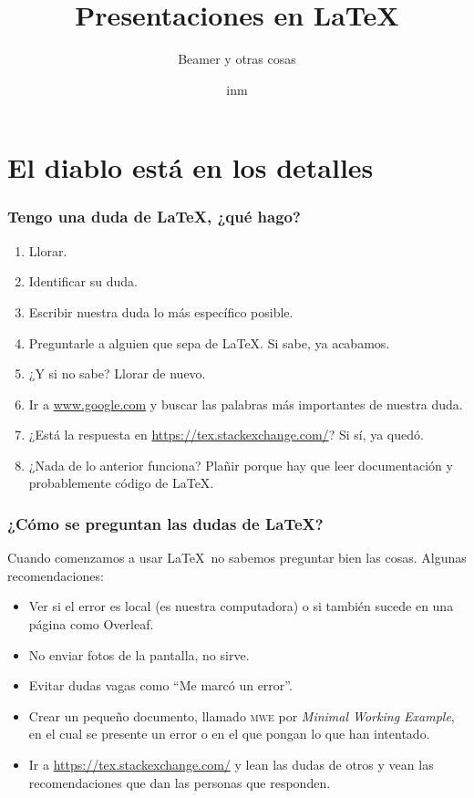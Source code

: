 \documentclass{beamer}
\title{Presentaciones en \LaTeX}
\subtitle{Beamer y otras cosas}
\author{inm}
\institute{Taller de \LaTeX}
\begin{document}
\begin{frame}
    \maketitle
\end{frame}

\section{El diablo está en los detalles}

\begin{frame}
    \frametitle{Tengo una duda de \LaTeX, ¿qué hago?}

    \begin{enumerate}[<+->]
        \item Llorar.
        \item Identificar su duda.
        \item Escribir nuestra duda lo más específico posible.
        \item Preguntarle a alguien que sepa de \LaTeX. Si sabe, ya acabamos.
        \item ¿Y si no sabe? Llorar de nuevo.
        \item Ir a \url{www.google.com} y buscar las palabras más importantes de nuestra duda.
        \item ¿Está la respuesta en \url{https://tex.stackexchange.com/}? Si sí, ya quedó.
        \item ¿Nada de lo anterior funciona? Plañir porque hay que leer documentación y probablemente código de \LaTeX.
    \end{enumerate}

\end{frame}

\begin{frame}
    \frametitle{¿Cómo se preguntan las dudas de \LaTeX?}

    Cuando comenzamos a usar \LaTeX\ no sabemos preguntar bien las cosas. Algunas recomendaciones:
    \begin{itemize}
        \item Ver si el error es local (es nuestra computadora) o si también sucede en una página como Overleaf.
        \item No enviar fotos de la pantalla, no sirve.
        \item Evitar dudas vagas como ``Me marcó un error''.
        \item Crear un pequeño documento, llamado \textsc{mwe} por \emph{Minimal Working Example}, en el cual se presente un error o en el que pongan lo que han intentado.
        \item Ir a \url{https://tex.stackexchange.com/} y lean las dudas de otros y vean las recomendaciones que dan las personas que responden.
    \end{itemize}

\end{frame}
\end{document}
